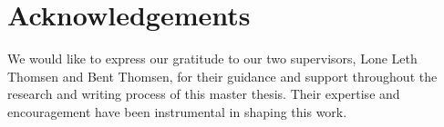 \section*{Acknowledgements}

We would like to express our gratitude to our two supervisors, Lone Leth Thomsen and Bent Thomsen, for their guidance and support throughout the research and writing process of this master thesis. Their expertise and encouragement have been instrumental in shaping this work.